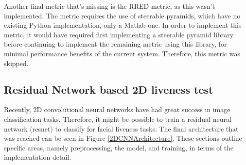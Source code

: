 \documentclass[10pt,a4paper]{article}
\begin{document}
        Another final metric that's missing is the RRED metric, as this wasn't implemented. The metric requires the use of steerable pyramids, which have no existing Python implementation, only a Matlab one. In order to implement this metric, it would have required first implementing a steerable pyramid library
        before continuing to implement the remaining metric using this library, for minimal performance benefits of the current system. Therefore, this metric was skipped. \cite{RRED}


    \subsection{Residual Network based 2D liveness test}
        Recently, 2D convolutional neural networks have had great success in image classification tasks. Therefore, it might be possible to train
        a residual neural network (resnet) to classify for facial liveness tasks. The final architecture that was reached can be seen in Figure \ref{2DCNNArchitecture}.
        These sections outline specific areas, namely preprocessing, the model, and training, in terms of the implementation detail.
\end{document}
